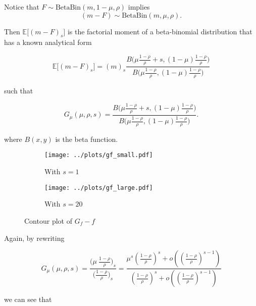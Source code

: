 \documentclass[american, abstract=on]{scrartcl}
\theoremstyle{plain}
\newcommand{\E}{\mathbb{E}}
\newcommand{\Beta}{\text{Beta}}
\newcommand{\Bin}{\text{Bin}}
\begin{document}
Notice that $F \sim \Beta\Bin(m, 1 - \mu, \rho)$ implies \begin{equation}(m - F) \sim \Beta\Bin(m, \mu, \rho).\end{equation}

Then $\E\big[(m - F)_s\big]$ is the factorial moment of a beta-binomial distribution that has a known analytical form

\begin{equation}
    \E\big[(m - F)_s\big] = (m)_s \frac{B\Big( \mu \frac{1 - \rho}{\rho} + s, (1 - \mu)\frac{1 - \rho}{\rho} \Big)}{B\Big( \mu \frac{1 - \rho}{\rho}, (1 - \mu)\frac{1 - \rho}{\rho} \Big)}
\end{equation}

such that

\begin{equation}
    G_\mu(\mu, \rho, s) = \frac{B\Big( \mu \frac{1 - \rho}{\rho} + s, (1 - \mu) \frac{1 - \rho}{\rho} \Big)}{B\Big( \mu \frac{1 - \rho}{\rho}, (1 - \mu) \frac{1 - \rho}{\rho} \Big)}.
\end{equation}

where $B(x, y)$ is the beta function.

\begin{figure}[H]
    \centering
    \begin{subfigure}{.5\textwidth}
        \centering
        \texttt{[image: ../plots/gf\_small.pdf]} 
        \caption{With $s = 1$}
        \label{fig:gf:small}  
    \end{subfigure}%
    \begin{subfigure}{.5\textwidth}
        \centering
        \texttt{[image: ../plots/gf\_large.pdf]}       
        \caption{With $s = 20$}
        \label{fig:gf:large}
    \end{subfigure}
    \caption{Contour plot of $G_f - f$}
    \label{fig:gf}
\end{figure}

Again, by rewriting

\begin{equation} \label{eq:limit_Gmu}
    G_\mu(\mu, \rho, s) = \frac{\Big( \mu \  \frac{1 - \rho}{\rho} \Big)_s}{\Big( \frac{1 - \rho}{\rho} \Big)_s} = \frac{\mu^s \left(\frac{1 - \rho}{\rho}\right)^s + o\left(\left(\frac{1 - \rho}{\rho}\right)^{s - 1} \right) }{\left(\frac{1 - \rho}{\rho}\right)^s + o\left(\left(\frac{1 - \rho}{\rho}\right)^{s - 1} \right)}
\end{equation}

we can see that
\end{document}
